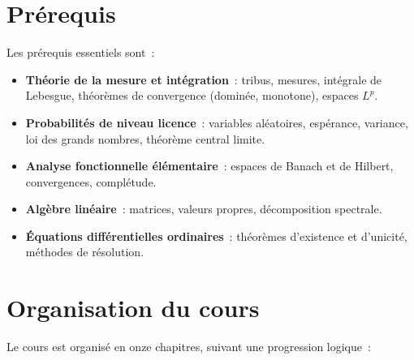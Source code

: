 \section*{Pr\'erequis}

Les pr\'erequis essentiels sont~:
\begin{itemize}
  \item \textbf{Th\'eorie de la mesure et int\'egration}~: tribus, mesures, int\'egrale
    de Lebesgue, th\'eor\`emes de convergence (domin\'ee, monotone), espaces $L^p$.
  \item \textbf{Probabilit\'es de niveau licence}~: variables al\'eatoires, esp\'erance,
    variance, loi des grands nombres, th\'eor\`eme central limite.
  \item \textbf{Analyse fonctionnelle \'el\'ementaire}~: espaces de Banach et de Hilbert,
    convergences, compl\'etude.
  \item \textbf{Alg\`ebre lin\'eaire}~: matrices, valeurs propres, d\'ecomposition
    spectrale.
  \item \textbf{\'Equations diff\'erentielles ordinaires}~: th\'eor\`emes d'existence
    et d'unicit\'e, m\'ethodes de r\'esolution.
\end{itemize}

\section*{Organisation du cours}

Le cours est organis\'e en onze chapitres, suivant une progression logique~:

